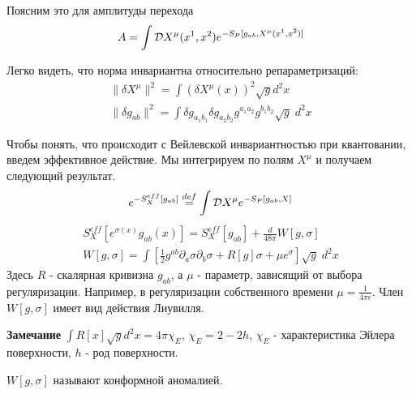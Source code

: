 \documentclass[a4paper,12pt]{article}
\theoremstyle{definition} \newtheorem{Def}{Definition}
\begin{document}
Поясним это для амплитуды перехода
\begin{equation}
  \label{eq:10}
  A=\int {\cal D}X^{\mu}(x^1,x^2)e^{-S_P[g_{ab},X^{\mu}(x^1,x^2)]}
\end{equation}

Легко видеть, что норма инвариантна относительно репараметризаций:
\begin{equation}
  \label{eq:11}
  \begin{split}
    \|\delta X^{\mu}\|^2 = \int \left(\delta X^{\mu}(x)\right)^2 \sqrt{g} d^2x\\
    \|\delta g_{ab}\|^2 = \int \delta g_{a_1 b_1}\delta g_{a_2 b_2} g^{a_1 a_2} g^{b_1 b_2} \sqrt{g}\; d^2x
  \end{split}
\end{equation}

Чтобы понять, что происходит с Вейлевской инвариантностью при квантовании, введем эффективное действие. Мы интегрируем по полям $X^{\mu}$ и получаем следующий результат.
\begin{equation}
  \label{eq:12} e^{-S_X^{eff}[g_{ab}]} \overset{def}{=} \int {\cal D}X^{\mu} e^{-S_P [g_{ab},X]}
\end{equation}
\begin{equation}
  \label{eq:13}
  \begin{split}
    S^{eff}_X [e^{\sigma(x)} g_{ab}(x) ] = S_X^{eff}[g_{ab}]+\frac{d}{48\pi}W[g,\sigma]\\
    W[g,\sigma]=\int \left[ \frac{1}{2} g^{ab}\partial_a\sigma \partial_b\sigma+R[g]\sigma+\mu e^{\sigma}\right] \sqrt{g}\; d^2x
  \end{split}
\end{equation} Здесь $R$ - скалярная кривизна $g_{ab}$, а $\mu$ - параметр, зависящий от выбора регуляризации. Например, в регуляризации собственного времени $\mu=\frac{1}{4\pi\epsilon}$. Член $W[g,\sigma]$ имеет вид действия Лиувилля.

{\bf Замечание} $\int R[x] \sqrt{g}d^2x = 4\pi \chi_E$, $\chi_E=2-2h$, $\chi_E$ - характеристика Эйлера поверхности, $h$ - род поверхности.

$W[g,\sigma]$ называют конформной аномалией.
\end{document}
